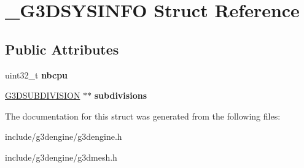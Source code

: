 \hypertarget{struct__G3DSYSINFO}{}\section{\+\_\+\+G3\+D\+S\+Y\+S\+I\+N\+FO Struct Reference}
\label{struct__G3DSYSINFO}
\subsection*{Public Attributes}
\begin{DoxyCompactItemize}
\item 
\mbox{\label{struct__G3DSYSINFO_ade21a642d67883aff1ed27174e4d6194}} 
uint32\+\_\+t {\bfseries nbcpu}
\item 
\mbox{\label{struct__G3DSYSINFO_ad9faff35c37769abb564d368aae709bd}} 
\hyperlink{struct__G3DSUBDIVISION}{G3\+D\+S\+U\+B\+D\+I\+V\+I\+S\+I\+ON} $\ast$$\ast$ {\bfseries subdivisions}
\end{DoxyCompactItemize}


The documentation for this struct was generated from the following files\+:\begin{DoxyCompactItemize}
\item 
include/g3dengine/g3dengine.\+h\item 
include/g3dengine/g3dmesh.\+h\end{DoxyCompactItemize}
